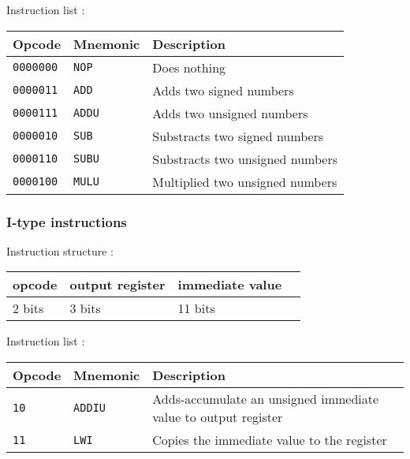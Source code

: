 \documentclass[a4paper]{report}
\begin{document}
Instruction list :

\begin{center}
	\begin{tabular}{|l|l|l|}
		\hline
		Opcode & Mnemonic & Description \\
		\hline \hline
		\texttt{0000000} & \texttt{NOP} &  Does nothing \\
		\texttt{0000011} & \texttt{ADD} &  Adds two signed numbers \\
		\texttt{0000111} & \texttt{ADDU} & Adds two unsigned numbers \\
		\texttt{0000010} & \texttt{SUB} &  Substracts two signed numbers \\
		\texttt{0000110} & \texttt{SUBU} & Substracts two unsigned numbers \\
		\texttt{0000100} & \texttt{MULU} & Multiplied two unsigned numbers \\
		\hline
	\end{tabular}
\end{center}

\subsubsection{I-type instructions}

Instruction structure :

\begin{center}
	\begin{tabular}{|l|l|l|l|}
		\hline
		opcode & output register & immediate value \\
		\hline
		2 bits & 3 bits & 11 bits \\
		\hline
	\end{tabular}
\end{center}

Instruction list :

\begin{center}
	\begin{tabular}{|l|l|l|}
		\hline
		Opcode & Mnemonic & Description \\
		\hline \hline
		\texttt{10} & \texttt{ADDIU} & Adds-accumulate an unsigned immediate
		                               value to output register \\
		\texttt{11} & \texttt{LWI} &   Copies the immediate value to
		                               the register \\
		\hline
	\end{tabular}
\end{center}
\end{document}
